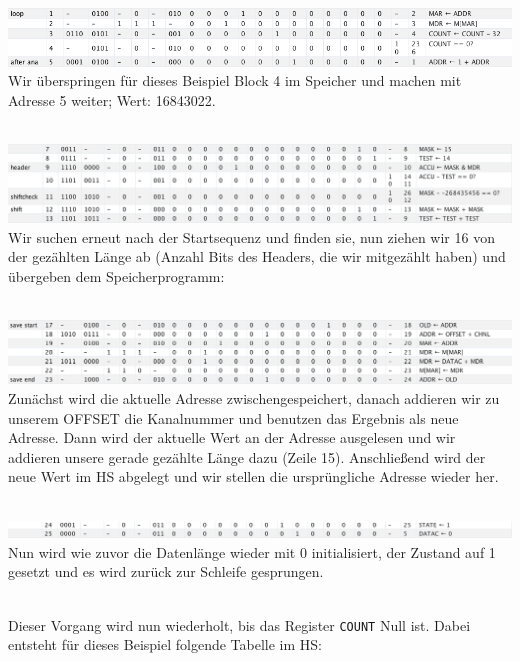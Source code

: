 \documentclass[12pt,titlepage]{article}
\begin{document}
\leavevmode \\
\includegraphics[width=16cm]{listing/row1-5.png}
\leavevmode \\
Wir überspringen für dieses Beispiel Block 4 im Speicher und machen mit Adresse 5 weiter; Wert: 16843022.

\leavevmode \\
\includegraphics[width=16cm]{listing/row7-13.png}
\leavevmode \\
Wir suchen erneut nach der Startsequenz und finden sie, nun ziehen wir 16 von der gezählten Länge ab (Anzahl Bits des Headers, die wir
mitgezählt haben) und übergeben dem Speicherprogramm:

\leavevmode \\
\includegraphics[width=16cm]{listing/row17-23.png}
\leavevmode \\
Zunächst wird die aktuelle Adresse zwischengespeichert, danach addieren wir zu unserem OFFSET die Kanalnummer und benutzen das Ergebnis
als neue Adresse. Dann wird der aktuelle Wert an der Adresse ausgelesen und wir addieren unsere gerade gezählte Länge dazu (Zeile 15).
Anschließend wird der neue Wert im HS abgelegt und wir stellen die ursprüngliche Adresse wieder her.

\leavevmode \\
\includegraphics[width=16cm]{listing/row24-25.png}
\leavevmode \\
Nun wird wie zuvor die Datenlänge wieder mit 0 initialisiert, der Zustand auf 1 gesetzt und es wird zurück zur Schleife gesprungen.

\leavevmode \\
Dieser Vorgang wird nun wiederholt, bis das Register \texttt{COUNT} Null ist. Dabei entsteht für dieses Beispiel folgende Tabelle im HS:
\end{document}
